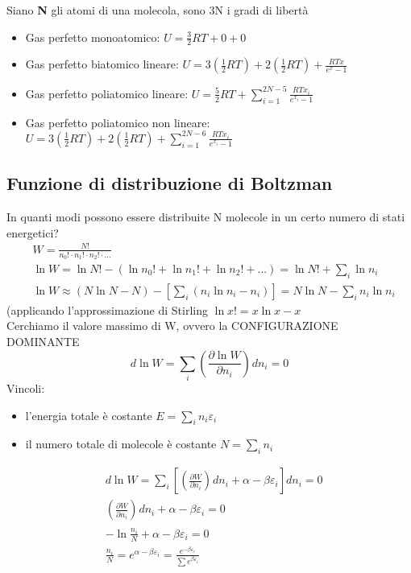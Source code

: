 \documentclass{article}
\newcommand{\dpar}[3]{\left(\frac{\partial #1}{\partial #2}\right)_{#3}d#2}
\begin{document}
Siano \textbf{N} gli atomi di una molecola, sono 3N i gradi di libertà
\begin{itemize}
    \item Gas perfetto monoatomico: $U=\frac{3}{2}RT+0+0$
    \item Gas perfetto biatomico lineare: $U=3(\frac{1}{2}RT)+2(\frac{1}{2}RT)+\frac{RTx}{e^x-1}$
    \item Gas perfetto poliatomico lineare: $U=\frac{5}{2}RT+\sum_{i=1}^{2N-5}\frac{RTx_i}{e^{x_i}-1}$
    \item Gas perfetto poliatomico non lineare: $U=3(\frac{1}{2}RT)+2(\frac{1}{2}RT)+\sum_{i=1}^{2N-6}\frac{RTx_i}{e^{x_i}-1}$
\end{itemize}

\subsection{Funzione di distribuzione di Boltzman}
In quanti modi possono essere distribuite N molecole in un certo numero di stati energetici?
\begin{align*}
    &W=\frac{N!}{n_0!\cdot n_1!\cdot n_2!\cdot ...}\\
    &\ln W=\ln N!-(\ln n_0!+\ln n_1!+\ln n_2!+...)=\ln N!+\sum_i\ln n_i\\
    &\ln W \approx (N\ln N-N)-[\sum_i(n_i\ln n_i-n_i)]=N\ln N -\sum_i n_i\ln n_i
\end{align*}
(applicando l'approssimazione di Stirling $\ln x!=x\ln x-x$
\\
Cerchiamo il valore massimo di W, ovvero la CONFIGURAZIONE DOMINANTE
\begin{equation*}
    d\ln W=\sum_i\dpar{\ln W}{n_i}{}=0
\end{equation*}
Vincoli:
\begin{itemize}
    \item l'energia totale è costante $E=\sum_in_i\varepsilon_i$
    \item il numero totale di molecole è costante $N=\sum_in_i$
\end{itemize}
\begin{align*}
    &d\ln W=\sum_i\left[ \dpar{W}{n_i}{} +\alpha-\beta\varepsilon_i \right]dn_i=0 \\
    & \dpar{W}{n_i}{} +\alpha-\beta\varepsilon_i=0\\
    &-\ln \frac{n_i}{N}+\alpha-\beta\varepsilon_i=0\\
    &\frac{n_i}{N}=e^{\alpha-\beta\varepsilon_i}=\frac{e^{-\beta\varepsilon_i}}{\sum e^{\beta\varepsilon_i}}
\end{align*}
\end{document}
